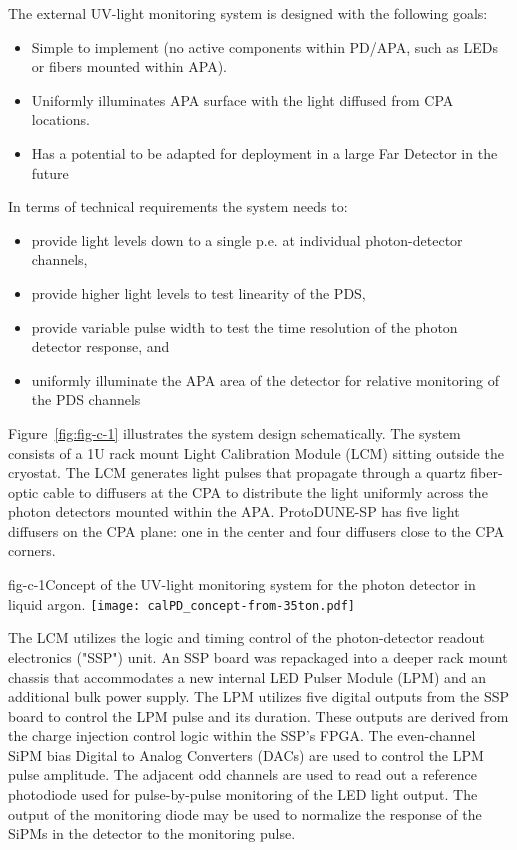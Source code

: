 The external UV-light monitoring system is designed with the following goals:
				
\begin{itemize}
\item Simple to implement (no active components within PD/APA, such as LEDs or fibers mounted within APA).
\item Uniformly illuminates APA surface with the light diffused from CPA locations.
\item Has a potential to be adapted for deployment in a large Far Detector in the future
\end{itemize}

In terms of technical requirements the system needs to:
\begin{itemize}
\item provide light levels down to a single p.e. at individual photon-detector channels,
\item provide higher light levels to test linearity of the PDS,
\item provide variable pulse width to test the time resolution of the photon detector response, and
\item uniformly illuminate the APA area of the detector for relative monitoring of the PDS channels
\end{itemize}

Figure~\ref{fig:fig-c-1} illustrates the system design schematically. The system consists of a 1U rack mount Light Calibration Module (LCM) sitting outside the cryostat. The LCM generates light pulses that propagate through a quartz fiber-optic cable to diffusers at the CPA to distribute the light uniformly across the photon detectors mounted within the APA.  ProtoDUNE-SP has five light 
diffusers on the CPA plane: one in the center and four diffusers close to the CPA corners. 
%
 \begin{cdrfigure}{fig-c-1}{Concept of the UV-light monitoring system for the photon detector in liquid argon.}
\texttt{[image: calPD\_concept-from-35ton.pdf]}
\end{cdrfigure}
%


The LCM utilizes the logic and timing control of the photon-detector readout electronics ("SSP") unit.  
An SSP board was repackaged into a deeper rack mount chassis that accommodates a new internal 
LED Pulser Module (LPM) and an additional bulk power supply. The LPM utilizes five digital outputs from the SSP board to control the LPM pulse and its duration.  
These outputs are derived from the charge injection control logic within the SSP's FPGA.  
The even-channel SiPM bias Digital to Analog Converters (DACs)
are used to control the LPM pulse amplitude.  
The adjacent odd channels are used to read out a reference photodiode used for pulse-by-pulse monitoring of the LED light output.  
The output of the monitoring diode may be used to normalize 
the response of the SiPMs in the detector to the monitoring pulse.



